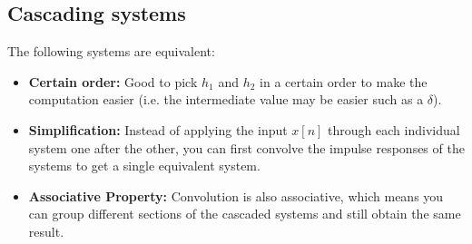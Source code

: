 \subsection{Cascading systems}
\begin{definition}
    The following systems are equivalent: 
    \begin{itemize}
        \item \textbf{Certain order:} Good to pick $h_1$ and $h_2$ in a certain order to make the computation easier (i.e. the intermediate value may be easier such as a $\delta$).
        \item \textbf{Simplification:} Instead of applying the input \( x[n] \) through each individual system one after the other, you can first convolve the impulse responses of the systems to get a single equivalent system. 
        \item \textbf{Associative Property:} Convolution is also associative, which means you can group different sections of the cascaded systems and still obtain the same result. 
    \end{itemize}
\end{definition}

